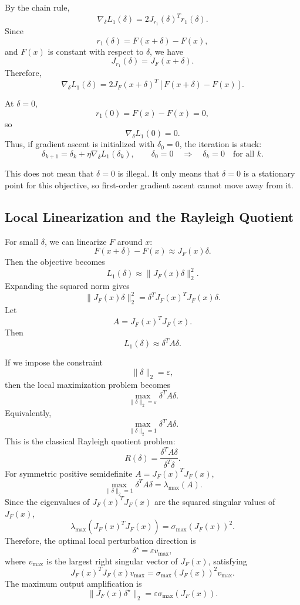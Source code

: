 \documentclass{article}
\begin{document}
By the chain rule,
\[
\nabla_\delta L_1(\delta)
=
2J_{r_1}(\delta)^T r_1(\delta).
\]
Since
\[
r_1(\delta)=F(x+\delta)-F(x),
\]
and \(F(x)\) is constant with respect to \(\delta\), we have
\[
J_{r_1}(\delta)=J_F(x+\delta).
\]
Therefore,
\[
\boxed{
\nabla_\delta L_1(\delta)
=
2J_F(x+\delta)^T
\left[
F(x+\delta)-F(x)
\right].
}
\]

At \(\delta=0\),
\[
r_1(0)=F(x)-F(x)=0,
\]
so
\[
\nabla_\delta L_1(0)=0.
\]
Thus, if gradient ascent is initialized with \(\delta_0=0\), the iteration is stuck:
\[
\delta_{k+1}
=
\delta_k+\eta \nabla_\delta L_1(\delta_k),
\qquad
\delta_0=0
\quad\Longrightarrow\quad
\delta_k=0
\quad\text{for all }k.
\]

This does not mean that \(\delta=0\) is illegal. It only means that \(\delta=0\) is a stationary point for this objective, so first-order gradient ascent cannot move away from it.

\subsection{Local Linearization and the Rayleigh Quotient}

For small \(\delta\), we can linearize \(F\) around \(x\):
\[
F(x+\delta)-F(x)
\approx
J_F(x)\delta.
\]
Then the objective becomes
\[
L_1(\delta)
\approx
\|J_F(x)\delta\|_2^2.
\]
Expanding the squared norm gives
\[
\|J_F(x)\delta\|_2^2
=
\delta^T J_F(x)^T J_F(x)\delta.
\]
Let
\[
A=J_F(x)^T J_F(x).
\]
Then
\[
L_1(\delta)\approx \delta^T A\delta.
\]

If we impose the constraint
\[
\|\delta\|_2=\varepsilon,
\]
then the local maximization problem becomes
\[
\max_{\|\delta\|_2=\varepsilon}
\delta^T A\delta.
\]
Equivalently,
\[
\max_{\|\delta\|_2=1}
\delta^T A\delta.
\]
This is the classical Rayleigh quotient problem:
\[
R(\delta)=\frac{\delta^T A\delta}{\delta^T\delta}.
\]
For symmetric positive semidefinite \(A=J_F(x)^TJ_F(x)\),
\[
\max_{\|\delta\|_2=1}\delta^T A\delta
=
\lambda_{\max}(A).
\]
Since the eigenvalues of \(J_F(x)^TJ_F(x)\) are the squared singular values of \(J_F(x)\),
\[
\lambda_{\max}\left(J_F(x)^TJ_F(x)\right)
=
\sigma_{\max}(J_F(x))^2.
\]
Therefore, the optimal local perturbation direction is
\[
\boxed{
\delta^\star=\varepsilon v_{\max},
}
\]
where \(v_{\max}\) is the largest right singular vector of \(J_F(x)\), satisfying
\[
J_F(x)^TJ_F(x)v_{\max}
=
\sigma_{\max}(J_F(x))^2v_{\max}.
\]
The maximum output amplification is
\[
\boxed{
\|J_F(x)\delta^\star\|_2
=
\varepsilon \sigma_{\max}(J_F(x)).
}
\]
\end{document}
